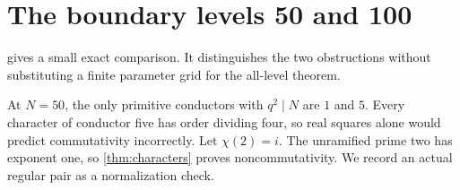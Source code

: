 \section{The boundary levels 50 and 100}\label{sec:examples}

 gives a small exact comparison.
It distinguishes the two obstructions without substituting a
finite parameter grid for the all-level theorem.
\BoundaryTable

At \(N=50\), the only primitive conductors with \(q^2\mid N\)
are \(1\) and \(5\). Every character of conductor five has
order dividing four, so real squares alone would predict
commutativity incorrectly. Let \(\chi(2)=i\).
The unramified prime two has exponent one, so
\cref{thm:characters} proves noncommutativity. We record an
actual regular pair as a normalization check.

